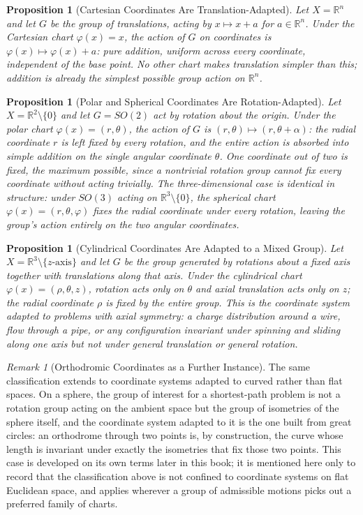 \documentclass[11pt,fleqn]{book}
\numberwithin{equation}{chapter}
\theoremstyle{plain}
\newtheorem{proposition}[theorem]{Proposition}
\theoremstyle{definition}
\theoremstyle{remark}
\newtheorem{remark}[theorem]{Remark}
\newcommand{\R}{\mathbb{R}}
\begin{document}
\begin{proposition}[Cartesian Coordinates Are Translation-Adapted]
Let \(X=\R^n\) and let \(G\) be the group of translations, acting by \(x\mapsto x+a\) for \(a\in\R^n\). Under the Cartesian chart \(\varphi(x)=x\), the action of \(G\) on coordinates is \(\varphi(x)\mapsto \varphi(x)+a\): pure addition, uniform across every coordinate, independent of the base point. No other chart makes translation simpler than this; addition is already the simplest possible group action on \(\R^n\).
\end{proposition}

\begin{proposition}[Polar and Spherical Coordinates Are Rotation-Adapted]
Let \(X=\R^2\setminus\{0\}\) and let \(G=SO(2)\) act by rotation about the origin. Under the polar chart \(\varphi(x)=(r,\theta)\), the action of \(G\) is \((r,\theta)\mapsto(r,\theta+\alpha)\): the radial coordinate \(r\) is left fixed by every rotation, and the entire action is absorbed into simple addition on the single angular coordinate \(\theta\). One coordinate out of two is fixed, the maximum possible, since a nontrivial rotation group cannot fix every coordinate without acting trivially. The three-dimensional case is identical in structure: under \(SO(3)\) acting on \(\R^3\setminus\{0\}\), the spherical chart \(\varphi(x)=(r,\theta,\varphi)\) fixes the radial coordinate under every rotation, leaving the group's action entirely on the two angular coordinates.
\end{proposition}

\begin{proposition}[Cylindrical Coordinates Are Adapted to a Mixed Group]
Let \(X=\R^3\setminus\{z\text{-axis}\}\) and let \(G\) be the group generated by rotations about a fixed axis together with translations along that axis. Under the cylindrical chart \(\varphi(x)=(\rho,\theta,z)\), rotation acts only on \(\theta\) and axial translation acts only on \(z\); the radial coordinate \(\rho\) is fixed by the entire group. This is the coordinate system adapted to problems with axial symmetry: a charge distribution around a wire, flow through a pipe, or any configuration invariant under spinning and sliding along one axis but not under general translation or general rotation.
\end{proposition}

\begin{remark}[Orthodromic Coordinates as a Further Instance]
The same classification extends to coordinate systems adapted to curved rather than flat spaces. On a sphere, the group of interest for a shortest-path problem is not a rotation group acting on the ambient space but the group of isometries of the sphere itself, and the coordinate system adapted to it is the one built from great circles: an orthodrome through two points is, by construction, the curve whose length is invariant under exactly the isometries that fix those two points. This case is developed on its own terms later in this book; it is mentioned here only to record that the classification above is not confined to coordinate systems on flat Euclidean space, and applies wherever a group of admissible motions picks out a preferred family of charts.
\end{remark}
\end{document}
